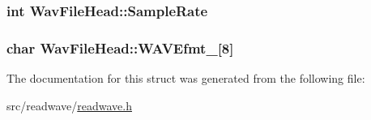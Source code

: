 \hypertarget{struct_wav_file_head_abf17ddae26fc3f08a43159f028ccb4dc}{
\subsubsection[{Sample\+Rate}]{\setlength{\rightskip}{0pt plus 5cm}int Wav\+File\+Head\+::\+Sample\+Rate}}\label{struct_wav_file_head_abf17ddae26fc3f08a43159f028ccb4dc}
\hypertarget{struct_wav_file_head_a14e02b5fba8c5e393d8bcd11152a1608}{
\subsubsection[{W\+A\+V\+Efmt\+\_\+}]{\setlength{\rightskip}{0pt plus 5cm}char Wav\+File\+Head\+::\+W\+A\+V\+Efmt\+\_\+\mbox{[}8\mbox{]}}}\label{struct_wav_file_head_a14e02b5fba8c5e393d8bcd11152a1608}


The documentation for this struct was generated from the following file\+:\begin{DoxyCompactItemize}
\item 
src/readwave/\hyperlink{readwave_8h}{readwave.\+h}\end{DoxyCompactItemize}
